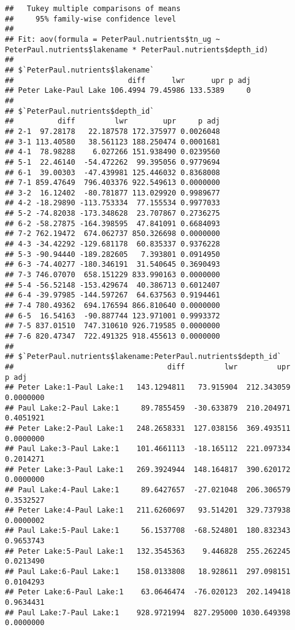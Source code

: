 \documentclass[]{article}
\begin{document}
\begin{verbatim}
##   Tukey multiple comparisons of means
##     95% family-wise confidence level
## 
## Fit: aov(formula = PeterPaul.nutrients$tn_ug ~ PeterPaul.nutrients$lakename * PeterPaul.nutrients$depth_id)
## 
## $`PeterPaul.nutrients$lakename`
##                          diff      lwr      upr p adj
## Peter Lake-Paul Lake 106.4994 79.45986 133.5389     0
## 
## $`PeterPaul.nutrients$depth_id`
##          diff         lwr        upr     p adj
## 2-1  97.28178   22.187578 172.375977 0.0026048
## 3-1 113.40580   38.561123 188.250474 0.0001681
## 4-1  78.98288    6.027266 151.938490 0.0239560
## 5-1  22.46140  -54.472262  99.395056 0.9779694
## 6-1  39.00303  -47.439981 125.446032 0.8368008
## 7-1 859.47649  796.403376 922.549613 0.0000000
## 3-2  16.12402  -80.781877 113.029920 0.9989677
## 4-2 -18.29890 -113.753334  77.155534 0.9977033
## 5-2 -74.82038 -173.348628  23.707867 0.2736275
## 6-2 -58.27875 -164.398595  47.841091 0.6684093
## 7-2 762.19472  674.062737 850.326698 0.0000000
## 4-3 -34.42292 -129.681178  60.835337 0.9376228
## 5-3 -90.94440 -189.282605   7.393801 0.0914950
## 6-3 -74.40277 -180.346191  31.540645 0.3690493
## 7-3 746.07070  658.151229 833.990163 0.0000000
## 5-4 -56.52148 -153.429674  40.386713 0.6012407
## 6-4 -39.97985 -144.597267  64.637563 0.9194461
## 7-4 780.49362  694.176594 866.810640 0.0000000
## 6-5  16.54163  -90.887744 123.971001 0.9993372
## 7-5 837.01510  747.310610 926.719585 0.0000000
## 7-6 820.47347  722.491325 918.455613 0.0000000
## 
## $`PeterPaul.nutrients$lakename:PeterPaul.nutrients$depth_id`
##                                   diff         lwr         upr     p adj
## Peter Lake:1-Paul Lake:1   143.1294811   73.915904  212.343059 0.0000000
## Paul Lake:2-Paul Lake:1     89.7855459  -30.633879  210.204971 0.4051921
## Peter Lake:2-Paul Lake:1   248.2658331  127.038156  369.493511 0.0000000
## Paul Lake:3-Paul Lake:1    101.4661113  -18.165112  221.097334 0.2014271
## Peter Lake:3-Paul Lake:1   269.3924944  148.164817  390.620172 0.0000000
## Paul Lake:4-Paul Lake:1     89.6427657  -27.021048  206.306579 0.3532527
## Peter Lake:4-Paul Lake:1   211.6260697   93.514201  329.737938 0.0000002
## Paul Lake:5-Paul Lake:1     56.1537708  -68.524801  180.832343 0.9653743
## Peter Lake:5-Paul Lake:1   132.3545363    9.446828  255.262245 0.0213490
## Paul Lake:6-Paul Lake:1    158.0133808   18.928611  297.098151 0.0104293
## Peter Lake:6-Paul Lake:1    63.0646474  -76.020123  202.149418 0.9634431
## Paul Lake:7-Paul Lake:1    928.9721994  827.295000 1030.649398 0.0000000

\end{verbatim}
\end{document}
